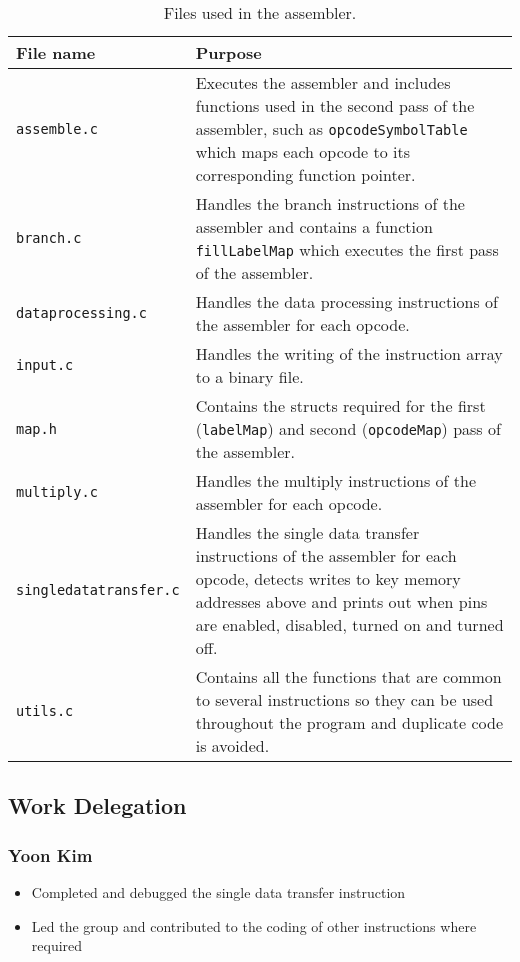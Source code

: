 \documentclass[11pt]{article}
\begin{document}
\begin{table}
\centering
\begin{tabular}{p{4cm}|p{12cm}}
File name & Purpose \\\hline
\texttt{assemble.c} & Executes the assembler and includes functions used in the second pass of the assembler, such as \texttt{opcodeSymbolTable} which maps each opcode to its corresponding function pointer. \\
\texttt{branch.c} & Handles the branch instructions of the assembler and contains a function \texttt{fillLabelMap} which executes the first pass of the assembler. \\
\texttt{dataprocessing.c} & Handles the data processing instructions of the assembler for each opcode. \\
\texttt{input.c} & Handles the writing of the instruction array to a binary file. \\
\texttt{map.h} & Contains the structs required for the first (\texttt{labelMap}) and second (\texttt{opcodeMap}) pass of the assembler. \\
\texttt{multiply.c} & Handles the multiply instructions of the assembler for each opcode. \\
\texttt{singledatatransfer.c} & Handles the single data transfer instructions of the assembler for each opcode, detects writes to key memory addresses above and prints out when pins are enabled, disabled, turned on and turned off.
  \\
\texttt{utils.c} & Contains all the functions that are common to several instructions so they can be used throughout the program and duplicate code is avoided. \\
\end{tabular}
\caption{\label{tab:widgets}Files used in the assembler.}
\end{table}

\subsection{Work Delegation}

\subsubsection{Yoon Kim}
\begin{itemize}
\item Completed and debugged the single data transfer instruction
\item Led the group and contributed to the coding of other instructions where required
\end{itemize}
\end{document}
